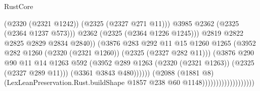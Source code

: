 \begin{lexlean}{RustCore}
\begin{coremodule}
                                                      (@2320 (@2321 @1242))
                                                      (@2325 (@2327 @271 @11)))
                                                    @3985
                                                    @2362
                                                    (@2325 (@2364 @1237 @573)))
                                                  @2362
                                                  (@2325 (@2364 @1226 @1245)))
                                                @2819
                                                @2822
                                                @2825
                                                @2829
                                                @2834
                                                @2840))
                                            (@3876
                                              @283
                                              @292
                                              @11
                                              @15
                                              @1260
                                              @1265
                                              (@3952
                                                @282
                                                @1260
                                                (@2320 (@2321 @1260))
                                                (@2325 (@2327 @282 @11)))
                                              (@3876
                                                @290
                                                @90
                                                @11
                                                @14
                                                @1263
                                                @592
                                                (@3952
                                                  @289
                                                  @1263
                                                  (@2320 (@2321 @1263))
                                                  (@2325 (@2327 @289 @11)))
                                                (@3361 @3843 @480))))))
                                      (@2088
                                        (@1881 @8)
                                        (LexLeanPreservation.Rust.buildShape
                                          @1857
                                          @238
                                          @60
                                          @1148)))))))))))))))))))

\end{coremodule}
\end{lexlean}

